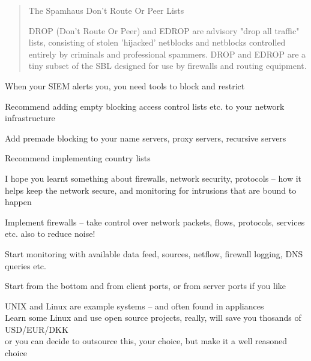 \documentclass[Screen16to9,17pt]{foils}
\begin{document}

\begin{quote}
The Spamhaus Don't Route Or Peer Lists

DROP (Don't Route Or Peer) and EDROP are advisory "drop all traffic" lists, consisting of stolen 'hijacked' netblocks and netblocks controlled entirely by criminals and professional spammers. DROP and EDROP are a tiny subset of the SBL designed for use by firewalls and routing equipment.
\end{quote}



\begin{list2}
\item When your SIEM alerts you, you need tools to block and restrict
\item Recommend adding empty blocking access control lists etc. to your network infrastructure
\item Add premade blocking to your name servers, proxy servers, recursive servers
\item Recommend implementing country lists
\end{list2}




I hope you learnt something about firewalls, network security, protocols -- how it helps keep the network secure, and monitoring for intrusions that are bound to happen

\begin{list2}
\item Implement firewalls – take control over network packets, flows, protocols, services etc.
also to reduce noise!
\item Start monitoring with available data feed, sources, netflow, firewall logging, DNS queries etc.
\item Start from the bottom and from client ports, or from server ports if you like

\item UNIX and Linux are example systems -- and often found in appliances\\
Learn some Linux and use open source projects, really, will save you thosands of USD/EUR/DKK\\
or you can decide to outsource this, your choice, but make it a well reasoned choice

\end{list2}


\end{document}
